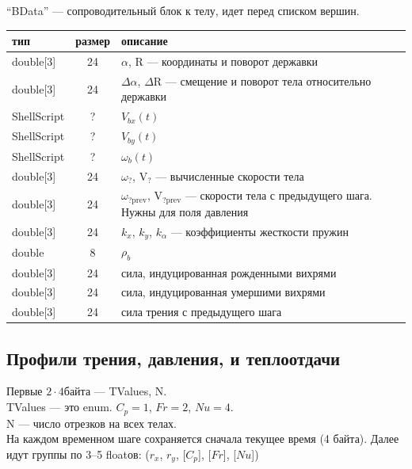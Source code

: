 \documentclass[a4paper,14pt]{extreport}
\newcommand{\br}[1]{\boldsymbol{\mathrm{#1}}}
\renewcommand{\vec}[1]{\br{#1}}
\begin{document}
``BData'' --- сопроводительный блок к телу, идет перед списком вершин.
\begin{tabular}{lcl}
\hline
тип & размер & описание\\\hline
double[3]    & 24 & $\alpha$, $\vec R$ --- координаты и поворот державки\\
double[3]    & 24 & $\Delta\alpha$, $\Delta\vec R$ --- смещение и поворот тела относительно державки\\
ShellScript  & ?  & $V_{bx}(t)$\\
ShellScript  & ?  & $V_{by}(t)$\\
ShellScript  & ?  & $\omega_{b}(t)$\\
double[3]    & 24 & $\omega_?$, $\vec V_?$ --- вычисленные скорости тела\\
double[3]    & 24 & $\omega_{?\text{prev}}$, $\vec V_{?\text{prev}}$ --- скорости тела с предыдущего шага. Нужны для поля давления\\
double[3]    & 24 & $k_x$, $k_y$, $k_\alpha$ --- коэффициенты жесткости пружин\\
double       & 8  & $\rho_b$\\
double[3]    & 24 & сила, индуцированная рожденными вихрями\\
double[3]    & 24 & сила, индуцированная умершими вихрями\\
double[3]    & 24 & сила трения с предыдущего шага\\
\hline
\end{tabular}

\subsection{Профили трения, давления, и теплоотдачи}
Первые $2 \cdot 4$байта --- TValues, N.\\
TValues --- это enum. $C_p=1$, $Fr=2$, $Nu=4$.\\
N --- число отрезков на всех телах.\\
На каждом временном шаге сохраняется сначала текущее время (4 байта). Далее идут группы по 3--5 floatов: ($r_x$, $r_y$, [$C_p$], [$Fr$], [$Nu$])
\end{document}
